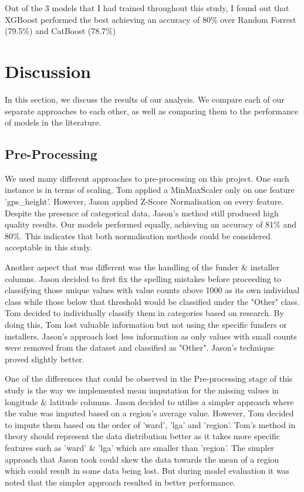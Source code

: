 \documentclass[conference]{IEEEtran}
\begin{document}
Out of the 3 models that I had trained throughout this study, I found out that XGBoost performed the best achieving an accuracy of 80\% over Random Forrest (79.5\%) and CatBoost (78.7\%)

\section{Discussion}

In this section, we discuss the results of our analysis. We compare each of our separate approaches to each other, as well as comparing them to the performance of models in the literature.

\subsection{Pre-Processing}

We used many different approaches to pre-processing on this project. One such instance is in terms of scaling. Tom applied a MinMaxScaler only on one feature 'gps\_height'. However, Jason applied Z-Score Normalisation on every feature. Despite the presence of categorical data, Jason's method still produced high quality results. Our models performed equally, achieving an accuracy of 81\% and 80\%. This indicates that both normalisation methods could be considered acceptable in this study.

Another aspect that was different was the handling of the funder \& installer columns. Jason decided to first fix the spelling mistakes before proceeding to classifying those unique values with value counts above 1000 as its own individual class while those below that threshold would be classified under the "Other" class. Tom decided to individually classify them in categories based on research. By doing this, Tom lost valuable information but not using the specific funders or installers. Jason's approach lost less information as only values with small counts were removed from the dataset and classified as "Other". Jason's technique proved slightly better.

One of the differences that could be observed in the Pre-processing stage of this study is the way we implemented mean imputation for the missing values in longitude \& latitude columns. Jason decided to utilise a simpler approach where the value was imputed based on a region's average value. However, Tom decided to impute them based on the order of 'ward', 'lga' and 'region'. Tom's method in theory should represent the data distribution better as it takes more specific features such as 'ward' \& 'lga' which are smaller than 'region'. The simpler approach that Jason took could skew the data towards the mean of a region which could result in some data being lost. But during model evaluation it was noted that the simpler approach resulted in better performance.
\end{document}
